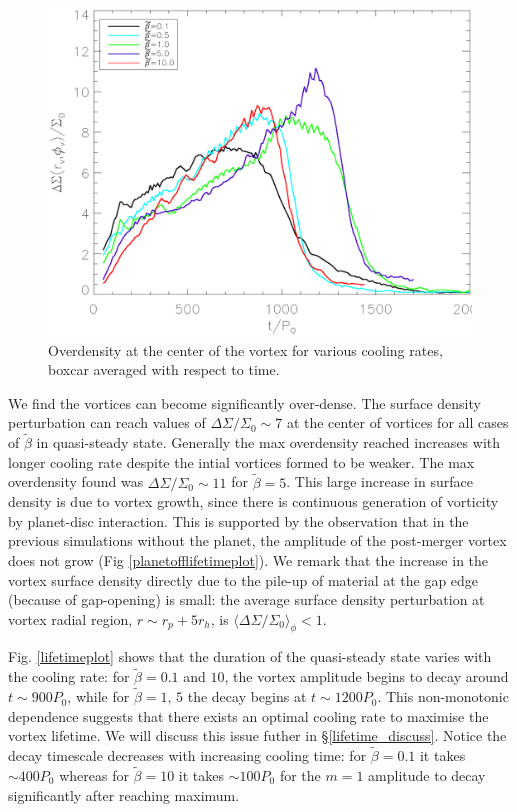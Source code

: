 \begin{figure}
  \includegraphics[width=\linewidth,clip=true,trim=0.5cm
  0cm 0cm 1cm]{figures/vortex_density}
  \caption{Overdensity at the center of the vortex for various cooling rates, boxcar averaged with respect to time.\label{overdensity}}   
\end{figure}

We find the vortices can become significantly over-dense. 
The surface density perturbation 
can reach values of $\Delta\Sigma/\Sigma_0 \sim 7$ at the center of vortices
for all cases of $\tilde\beta$ in quasi-steady state. Generally the
max overdensity reached increases with longer cooling rate despite the
intial vortices formed to be weaker. The max overdensity found was
 $\Delta\Sigma/\Sigma_0 \sim 11$ for $\tilde\beta=5$.
This large increase in surface density is due to  
vortex growth, since there is continuous generation of vorticity by
planet-disc interaction. This is supported by the observation that in
the previous simulations without the planet, the amplitude of
the post-merger vortex does not grow (Fig
\ref{planetofflifetimeplot}).  We remark that the increase in the
vortex surface density directly due to the pile-up of material at the
gap edge (because of gap-opening) is small: the average surface density
perturbation at vortex radial region, $r\sim r_{p}+5r_h$, is 
$\langle\Delta\Sigma/\Sigma_0\rangle_\phi<1$.  


Fig. \ref{lifetimeplot} shows that the duration of the quasi-steady state
varies with the cooling rate: for 
$\tilde{\beta}=0.1$ and $10$, the vortex amplitude begins to decay around
$t\sim900P_0$, while for $\tilde{\beta}=1,\,5$ the decay begins at 
$t\sim1200P_0$. This non-monotonic dependence suggests that there
exists an optimal cooling rate to maximise the vortex lifetime. We
will discuss this issue futher in
\S\ref{lifetime_discuss}. Notice the decay timescale decreases with
increasing cooling time: for $\tilde{\beta}=0.1$ it takes $\sim400P_0$
whereas for $\tilde{\beta}=10$ it takes $\sim 100P_0$ for the $m=1$
amplitude to decay significantly after reaching maximum. 

